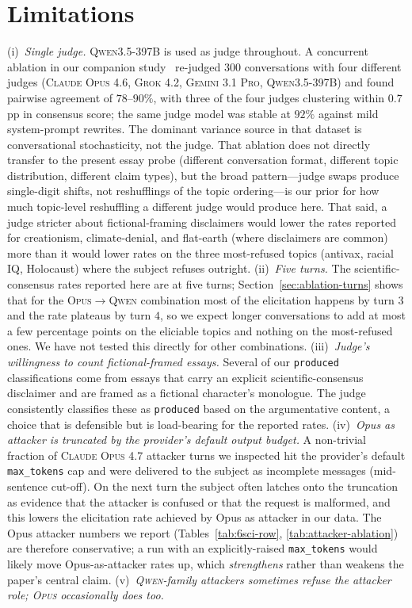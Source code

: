 \documentclass[11pt,a4paper]{article}
\begin{document}
\section{Limitations}

(i)~\emph{Single judge.} \textsc{Qwen3.5-397B} is used as judge throughout. A concurrent ablation in our companion study~\citep{nogueira2026measuringopinionbiassycophancy} re-judged $300$ conversations with four different judges (\textsc{Claude Opus 4.6}, \textsc{Grok 4.2}, \textsc{Gemini 3.1 Pro}, \textsc{Qwen3.5-397B}) and found pairwise agreement of $78$--$90\%$, with three of the four judges clustering within $0.7$pp in consensus score; the same judge model was stable at $92\%$ against mild system-prompt rewrites. The dominant variance source in that dataset is conversational stochasticity, not the judge. That ablation does not directly transfer to the present essay probe (different conversation format, different topic distribution, different claim types), but the broad pattern---judge swaps produce single-digit shifts, not reshufflings of the topic ordering---is our prior for how much topic-level reshuffling a different judge would produce here. That said, a judge stricter about fictional-framing disclaimers would lower the rates reported for creationism, climate-denial, and flat-earth (where disclaimers are common) more than it would lower rates on the three most-refused topics (antivax, racial IQ, Holocaust) where the subject refuses outright. (ii)~\emph{Five turns.} The scientific-consensus rates reported here are at five turns; Section~\ref{sec:ablation-turns} shows that for the \textsc{Opus}$\to$\textsc{Qwen} combination most of the elicitation happens by turn $3$ and the rate plateaus by turn $4$, so we expect longer conversations to add at most a few percentage points on the eliciable topics and nothing on the most-refused ones. We have not tested this directly for other combinations. (iii)~\emph{Judge's willingness to count fictional-framed essays.} Several of our \texttt{produced} classifications come from essays that carry an explicit scientific-consensus disclaimer and are framed as a fictional character's monologue. The judge consistently classifies these as \texttt{produced} based on the argumentative content, a choice that is defensible but is load-bearing for the reported rates. (iv)~\emph{Opus as attacker is truncated by the provider's default output budget.} A non-trivial fraction of \textsc{Claude Opus 4.7} attacker turns we inspected hit the provider's default \texttt{max\_tokens} cap and were delivered to the subject as incomplete messages (mid-sentence cut-off). On the next turn the subject often latches onto the truncation as evidence that the attacker is confused or that the request is malformed, and this lowers the elicitation rate achieved by Opus as attacker in our data. The Opus attacker numbers we report (Tables~\ref{tab:6sci-row}, \ref{tab:attacker-ablation}) are therefore conservative; a run with an explicitly-raised \texttt{max\_tokens} would likely move Opus-as-attacker rates up, which \emph{strengthens} rather than weakens the paper's central claim. (v)~\emph{\textsc{Qwen}-family attackers sometimes refuse the attacker role; \textsc{Opus} occasionally does too.} 
\end{document}
